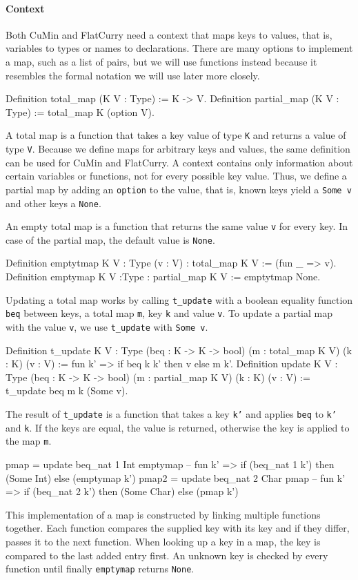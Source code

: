 \documentclass[paper = a4, fleqn, abstract=on, twoside]{scrreprt}
\begin{document}
\paragraph{Context}
Both CuMin and FlatCurry need a context that maps keys to values, that is, variables to types or names to declarations. There are many options to implement a map, such as a list of pairs, but we will use functions instead because it resembles the formal notation we will use later more closely.
\begin{coqcode}
Definition total_map   (K V : Type) := K -> V.
Definition partial_map (K V : Type) := total_map K (option V).
\end{coqcode}
A total map is a function that takes a key value of type \texttt{K} and returns a value of type \texttt{V}. Because we define maps for arbitrary keys and values, the same definition can be used for CuMin and FlatCurry. A context contains only information about certain variables or functions, not for every possible key value. Thus, we define a partial map by adding an \texttt{option} to the value, that is, known keys yield a \texttt{Some v} and other keys a \texttt{None}.
\par
An empty total map is a function that returns the same value \texttt{v}  for every key. In case of the partial map, the default value is \texttt{None}.
\begin{coqcode}
Definition emptytmap {K V : Type} (v : V) : total_map K V := (fun _ => v).
Definition emptymap {K V :Type} : partial_map K V := emptytmap None.
\end{coqcode}
Updating a total map works by calling \texttt{t\_update} with a boolean equality function \texttt{beq} between keys, a total map \texttt{m}, key \texttt{k} and value \texttt{v}. To update a partial map with the value \texttt{v}, we use \texttt{t\_update} with \texttt{Some v}.
\begin{coqcode}
Definition t_update {K V : Type} (beq : K -> K -> bool) (m : total_map K V)
(k : K) (v : V) := fun k' => if beq k k' then v else m k'.
Definition update {K V : Type} (beq : K -> K -> bool) (m : partial_map K V)
(k : K) (v : V) := t_update beq m k (Some v).
\end{coqcode}
The result of \texttt{t\_update} is a function that takes a key \texttt{k'} and applies \texttt{beq} to \texttt{k'} and \texttt{k}. If the keys are equal, the value is returned, otherwise the key is applied to the map \texttt{m}. 
\begin{coqcode}
pmap = update beq_nat 1 Int emptymap
-- fun k' => if (beq_nat 1 k') then (Some Int) else (emptymap k')
pmap2 = update beq_nat 2 Char pmap
-- fun k' => if (beq_nat 2 k') then (Some Char) else (pmap k')   
\end{coqcode}
This implementation of a map is constructed by linking multiple functions together. Each function compares the supplied key with its key and if they differ, passes it to the next function. When looking up a key in a map, the key is compared to the last added entry first. An unknown key is checked by every function until finally \texttt{emptymap} returns \texttt{None}.
\end{document}
